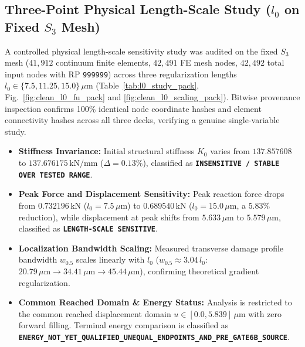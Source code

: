 \clearpage

\subsection{Three-Point Physical Length-Scale Study ($l_0$ on Fixed $S_3$ Mesh)}
A controlled physical length-scale sensitivity study was audited on the fixed $S_3$ mesh ($41{,}912$ continuum finite elements, $42{,}491$ FE mesh nodes, $42{,}492$ total input nodes with RP \texttt{999999}) across three regularization lengths $l_0 \in \{7.5, 11.25, 15.0\}\,\mu\mathrm{m}$ (Table~\ref{tab:l0_study_pack}, Fig.~\ref{fig:clean_l0_fu_pack} and \ref{fig:clean_l0_scaling_pack}). Bitwise provenance inspection confirms 100\% identical node coordinate hashes and element connectivity hashes across all three decks, verifying a genuine single-variable study.
\begin{itemize}
  \item \textbf{Stiffness Invariance:} Initial structural stiffness $K_0$ varies from $137.857608$ to $137.676175\,\mathrm{kN/mm}$ ($\Delta = 0.13\%$), classified as \textbf{\texttt{INSENSITIVE / STABLE OVER TESTED RANGE}}.
  \item \textbf{Peak Force and Displacement Sensitivity:} Peak reaction force drops from $0.732196\,\mathrm{kN}$ ($l_0 = 7.5\,\mu\mathrm{m}$) to $0.689540\,\mathrm{kN}$ ($l_0 = 15.0\,\mu\mathrm{m}$, a $5.83\%$ reduction), while displacement at peak shifts from $5.633\,\mu\mathrm{m}$ to $5.579\,\mu\mathrm{m}$, classified as \textbf{\texttt{LENGTH-SCALE SENSITIVE}}.
  \item \textbf{Localization Bandwidth Scaling:} Measured transverse damage profile bandwidth $w_{0.5}$ scales linearly with $l_0$ ($w_{0.5} \approx 3.04\,l_0$: $20.79\,\mu\mathrm{m} \to 34.41\,\mu\mathrm{m} \to 45.44\,\mu\mathrm{m}$), confirming theoretical gradient regularization.
  \item \textbf{Common Reached Domain \& Energy Status:} Analysis is restricted to the common reached displacement domain $u \in [0.0, 5.839]\,\mu\mathrm{m}$ with zero forward filling. Terminal energy comparison is classified as \textbf{\texttt{ENERGY\_NOT\_YET\_QUALIFIED\_UNEQUAL\_ENDPOINTS\_AND\_PRE\_GATE6B\_SOURCE}}.
\end{itemize}


